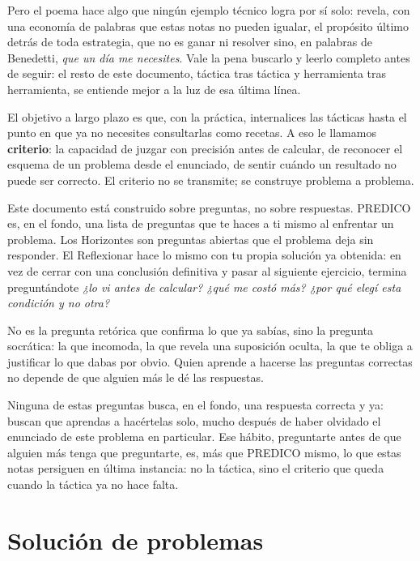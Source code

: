 \documentclass[11pt]{book}
\begin{document}
\medskip
Pero el poema hace algo que ningún ejemplo técnico logra por sí solo: revela, con una economía de palabras que estas notas no pueden igualar, el propósito último detrás de toda estrategia, que no es ganar ni resolver sino, en palabras de Benedetti, {\it que un día me necesites}. Vale la pena buscarlo y leerlo completo antes de seguir: el resto de este documento, táctica tras táctica y herramienta tras herramienta, se entiende mejor a la luz de esa última línea.

\medskip
El objetivo a largo plazo es que, con la práctica, internalices las tácticas hasta el punto en que ya no necesites consultarlas como recetas. A eso le llamamos {\bf criterio}: la capacidad de juzgar con precisión antes de calcular, de reconocer el esquema de un problema desde el enunciado, de sentir cuándo un resultado no puede ser correcto. El criterio no se transmite; se construye problema a problema.


\medskip
{}

\medskip
Este documento está construido sobre preguntas, no sobre respuestas. PREDICO es, en el fondo, una lista de preguntas que te haces a ti mismo al enfrentar un problema. Los Horizontes son preguntas abiertas que el problema deja sin responder. El Reflexionar hace lo mismo con tu propia solución ya obtenida: en vez de cerrar con una conclusión definitiva y pasar al siguiente ejercicio, termina preguntándote {\it ¿lo vi antes de calcular? ¿qué me costó más? ¿por qué elegí esta condición y no otra?}

No es la pregunta retórica que confirma lo que ya sabías, sino la pregunta socrática: la que incomoda, la que revela una suposición oculta, la que te obliga a justificar lo que dabas por obvio. Quien aprende a hacerse las preguntas correctas no depende de que alguien más le dé las respuestas.

\medskip
Ninguna de estas preguntas busca, en el fondo, una respuesta correcta y ya: buscan que aprendas a hacértelas solo, mucho después de haber olvidado el enunciado de este problema en particular. Ese hábito, preguntarte antes de que alguien más tenga que preguntarte, es, más que PREDICO mismo, lo que estas notas persiguen en última instancia: no la táctica, sino el criterio que queda cuando la táctica ya no hace falta.

\section{Solución de problemas}
\end{document}
